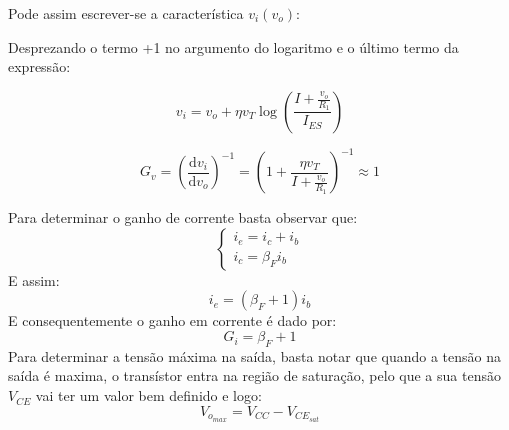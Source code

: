 \documentclass[%
  reprint,
  nofootinbib,
  amsmath,amssymb,
  aps,
  10pt,
  a4paper
]{revtex4-1}
\begin{document}
Pode assim escrever-se a característica $v_i(v_o)$:


Desprezando o termo +1 no argumento do logaritmo e o último termo da expressão:

\begin{equation}
v_i=v_o+\eta v_T\log \left(\frac{I+\frac{v_o}{R_1}}{I_{ES}}\right)
\end{equation}

\begin{equation}
G_v=\left(\frac{\mathrm{d}v_i}{\mathrm{d}v_o}\right)^{-1}=\left(1+\frac{\eta v_T}{I+\frac{v_o}{R_1}}\right)^{-1}\approx 1
\label{eq:g_v}
\end{equation}

Para determinar o ganho de corrente basta observar que:
\begin{equation}
\begin{cases} i_e=i_c+i_b\\ i_c=\beta_F i_b
\end{cases}
\end{equation}
E assim:
\begin{equation}
i_e=(\beta_F+1)i_b
\end{equation}
E consequentemente o ganho em corrente é dado por:
\begin{equation}
G_i=\beta_F+1
\label{eq:g_i}
\end{equation}
Para determinar a tensão máxima na saída, basta notar que quando a tensão na saída é maxima, o transístor entra na região de saturação, pelo que a sua tensão $V_{CE}$ vai ter um valor bem definido e logo:
\begin{equation}
V_{o_{max}}=V_{CC}-V_{{CE}_{sat}}
\label{eq:sat}
\end{equation}
\end{document}
